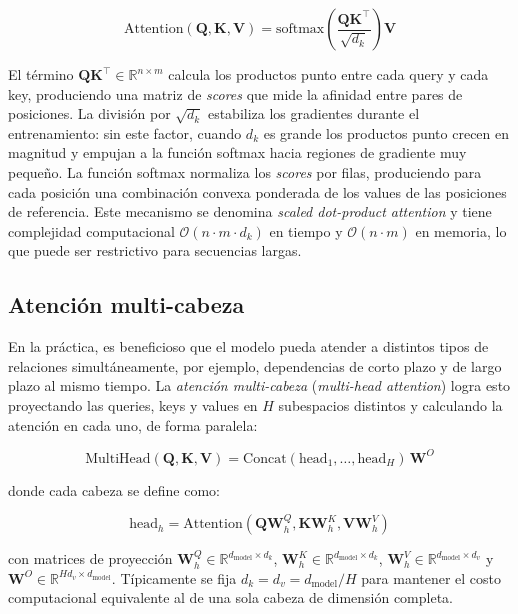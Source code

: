 \begin{equation}
\text{Attention}(\mathbf{Q}, \mathbf{K}, \mathbf{V}) = \text{softmax}\left(\frac{\mathbf{Q}\mathbf{K}^\top}{\sqrt{d_k}}\right)\mathbf{V}
\end{equation}

El término $\mathbf{Q}\mathbf{K}^\top \in \mathbb{R}^{n \times m}$ calcula los productos punto entre cada query y cada key, produciendo una matriz de \textit{scores} que mide la afinidad entre pares de posiciones. La división por $\sqrt{d_k}$ estabiliza los gradientes durante el entrenamiento: sin este factor, cuando $d_k$ es grande los productos punto crecen en magnitud y empujan a la función softmax hacia regiones de gradiente muy pequeño. La función softmax normaliza los \textit{scores} por filas, produciendo para cada posición una combinación convexa ponderada de los values de las posiciones de referencia. Este mecanismo se denomina \textit{scaled dot-product attention} y tiene complejidad computacional $\mathcal{O}(n \cdot m \cdot d_k)$ en tiempo y $\mathcal{O}(n \cdot m)$ en memoria, lo que puede ser restrictivo para secuencias largas.

\subsection{Atención multi-cabeza}

En la práctica, es beneficioso que el modelo pueda atender a distintos tipos de relaciones simultáneamente, por ejemplo, dependencias de corto plazo y de largo plazo al mismo tiempo. La \textit{atención multi-cabeza} (\textit{multi-head attention}) logra esto proyectando las queries, keys y values en $H$ subespacios distintos y calculando la atención en cada uno, de forma paralela:

\begin{equation}
\text{MultiHead}(\mathbf{Q}, \mathbf{K}, \mathbf{V}) = \text{Concat}(\text{head}_1, \ldots, \text{head}_H) \,\mathbf{W}^O
\end{equation}

donde cada cabeza se define como:

\begin{equation}
\text{head}_h = \text{Attention}(\mathbf{Q}\mathbf{W}_h^Q, \mathbf{K}\mathbf{W}_h^K, \mathbf{V}\mathbf{W}_h^V)
\end{equation}

con matrices de proyección $\mathbf{W}_h^Q \in \mathbb{R}^{d_{\text{model}} \times d_k}$, $ \mathbf{W}_h^K \in \mathbb{R}^{d_{\text{model}} \times d_k}$, $\mathbf{W}_h^V \in \mathbb{R}^{d_{\text{model}} \times d_v}$ y $\mathbf{W}^O \in \mathbb{R}^{H d_v \times d_{\text{model}}}$. Típicamente se fija $d_k = d_v = d_{\text{model}} / H$ para mantener el costo computacional equivalente al de una sola cabeza de dimensión completa.

